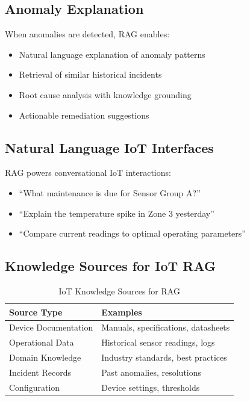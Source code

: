\documentclass[12pt,a4paper]{article}
\begin{document}
\subsection{Anomaly Explanation}

When anomalies are detected, RAG enables:
\begin{itemize}
    \item Natural language explanation of anomaly patterns
    \item Retrieval of similar historical incidents
    \item Root cause analysis with knowledge grounding
    \item Actionable remediation suggestions
\end{itemize}

\subsection{Natural Language IoT Interfaces}

RAG powers conversational IoT interactions:
\begin{itemize}
    \item ``What maintenance is due for Sensor Group A?''
    \item ``Explain the temperature spike in Zone 3 yesterday''
    \item ``Compare current readings to optimal operating parameters''
\end{itemize}

\subsection{Knowledge Sources for IoT RAG}

\begin{table}[H]
\centering
\caption{IoT Knowledge Sources for RAG}
\begin{tabular}{ll}
\toprule
\textbf{Source Type} & \textbf{Examples} \\
\midrule
Device Documentation & Manuals, specifications, datasheets \\
Operational Data & Historical sensor readings, logs \\
Domain Knowledge & Industry standards, best practices \\
Incident Records & Past anomalies, resolutions \\
Configuration & Device settings, thresholds \\
\bottomrule
\end{tabular}
\end{table}
\end{document}
